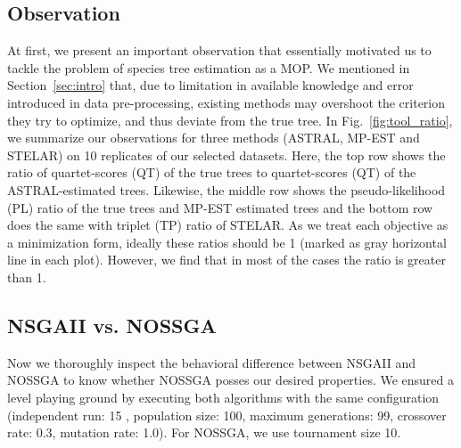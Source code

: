 \subsection{Observation}
\label{subsec:observation}
At first, we present an important observation that essentially motivated us to tackle the problem of species tree estimation as a MOP. We mentioned in Section~\ref{sec:intro} that, due to limitation in available knowledge and error introduced in data pre-processing, existing methods may overshoot the criterion they try to optimize, and thus deviate from the true tree. In Fig.~\ref{fig:tool_ratio}, we summarize our observations for three methods (ASTRAL, MP-EST and STELAR) on 10 replicates of our selected datasets. Here, the top row shows the ratio of quartet-scores (QT) of the true trees to quartet-scores (QT) of the ASTRAL-estimated trees. Likewise, the middle row shows the pseudo-likelihood (PL) ratio of the true trees and MP-EST estimated trees and the bottom row does the same with triplet (TP) ratio of STELAR. As we treat each objective as a minimization form, ideally these ratios should be 1 (marked as gray horizontal line in each plot). However, we find that in most of the cases the ratio is greater than 1. %


\subsection{NSGAII vs. NOSSGA}
Now we thoroughly inspect the behavioral difference between NSGAII and NOSSGA to know whether NOSSGA posses our desired properties. We ensured a level playing ground by executing both algorithms with the same configuration (independent run: 15 , population size: 100, maximum generations: 99, crossover rate: 0.3, mutation rate: 1.0). For NOSSGA, we use tournament size 10.

